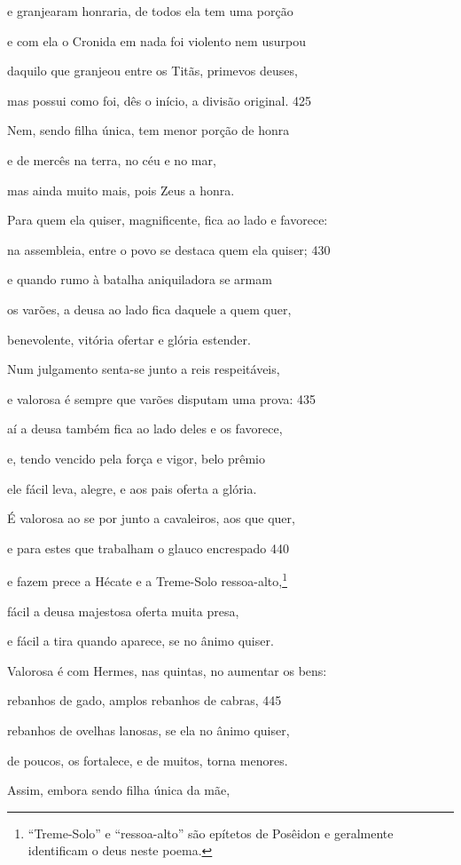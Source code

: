 e granjearam honraria, de todos ela tem uma porção

e com ela o Cronida em nada foi violento nem usurpou

daquilo que granjeou entre os Titãs, primevos deuses,

mas possui como foi, dês o início, a divisão original. \num{425}

Nem, sendo filha única, tem menor porção de honra

e de mercês na terra, no céu e no mar,

mas ainda muito mais, pois Zeus a honra.

Para quem ela quiser, magnificente, fica ao lado e favorece:

na assembleia, entre o povo se destaca quem ela quiser; \num{430}

e quando rumo à batalha aniquiladora se armam

os varões, a deusa ao lado fica daquele a quem quer,

benevolente, vitória ofertar e glória estender.

Num julgamento senta-se junto a reis respeitáveis,

e valorosa é sempre que varões disputam uma prova: \num{435}

aí a deusa também fica ao lado deles e os favorece,

e, tendo vencido pela força e vigor, belo prêmio

ele fácil leva, alegre, e aos pais oferta a glória.

É valorosa ao se por junto a cavaleiros, aos que quer,

e para estes que trabalham o glauco encrespado \num{440}

e fazem prece a Hécate e a Treme-Solo ressoa-alto,\footnote{``Treme-Solo'' e ``ressoa-alto'' são epítetos de Posêidon e geralmente identificam o deus neste poema.}

fácil a deusa majestosa oferta muita presa,

e fácil a tira quando aparece, se no ânimo quiser.

Valorosa é com Hermes, nas quintas, no aumentar os bens:

rebanhos de gado, amplos rebanhos de cabras, \num{445}

rebanhos de ovelhas lanosas, se ela no ânimo quiser,

de poucos, os fortalece, e de muitos, torna menores.

Assim, embora sendo filha única da mãe,

